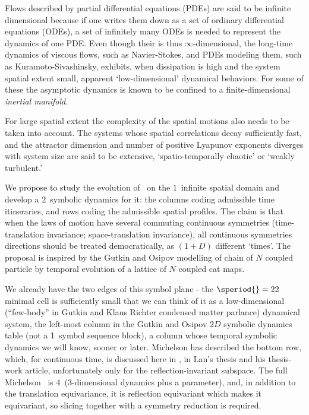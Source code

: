 Flows described by partial differential equations (PDEs) are
said to be infinite dimensional because if one writes them
down as a set of ordinary differential equations (ODEs), a set
of infinitely many ODEs is needed to represent the dynamics
of one PDE. Even though their {\statesp} is thus
$\infty$-dimensional, the long-\-time dynamics of viscous
flows, such as Navier-Stokes, and PDEs modeling them, such as
Kuramoto-Sivashinsky, exhibits, when dissipation is high and
the system spatial extent small, apparent `low-dimensional'
dynamical behaviors. For some of these the asymptotic
dynamics is known to be confined to a finite-\-dimensional
{\em inertial manifold}.

For large spatial extent the complexity of the spatial
motions also needs to be taken into account. The systems
whose spatial correlations decay sufficiently fast, and the
attractor dimension and number of positive Lyapunov exponents
diverges with system size are said
to be extensive, `spatio-temporally chaotic' or `weakly
turbulent.'

We propose to study the evolution of \KS\ on the $1$\dmn\ infinite
spatial domain and develop a $2$\dmn\ symbolic dynamics for it: the
columns coding admissible time itineraries, and rows coding the
admissible spatial profiles.
The claim is that when the laws of motion
have several commuting continuous symmetries (time-translation
invariance; space-translation invariance), all continuous symmetries
directions should be treated democratically, as $(1+D)$ different
`times'. The proposal is inspired by the Gutkin and Osipov
modelling of chain of $N$ coupled particle by temporal evolution of a
lattice of $N$ coupled cat maps.

We already have the two edges of this symbol plane - the $\speriod{}=22$ minimal
cell is sufficiently small that we can think of it as
a low-dimensional (``few-body'' in Gutkin and Klaus
Richter condensed matter parlance)
dynamical system, the left-most column in the Gutkin and
Osipov $2D$ symbolic dynamics {\spt} table (not a
1\dmn\ symbol sequence block), a column whose temporal symbolic dynamics
we will know, sooner or later. Michelson has described the
bottom row, which, for continuous time, is discussed here in
, in Lan's thesis and his thesis-work
article, unfortunately only for the reflection-invariant
subspace. The full Michelson \statesp\ is 4\dmn\ (3-dimensional dynamics
plus a parameter), and, in addition to the translation equivariance, it
is reflection equivariant which makes it 
equivariant, so slicing together with a  symmetry reduction is
required.

